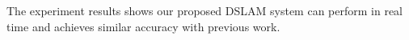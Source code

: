 \label{sec:experiment}
The experiment results shows our proposed DSLAM system can perform in real time and achieves similar accuracy with previous work.